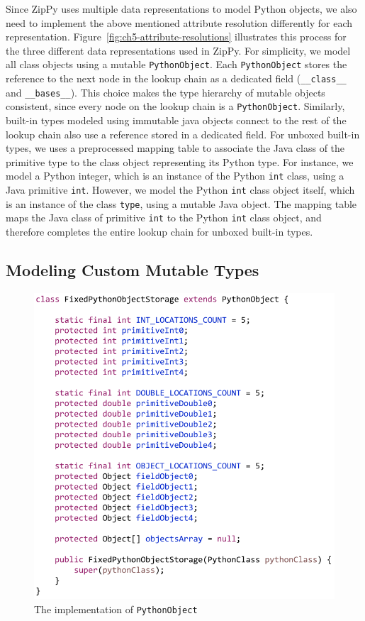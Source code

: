 Since ZipPy uses multiple data representations to model Python objects, we also need to implement the above mentioned attribute resolution differently for each representation.
Figure~\ref{fig:ch5-attribute-resolutions} illustrates this process for the three different data representations used in ZipPy.
For simplicity, we model all class objects using a mutable \texttt{PythonObject}.
Each \texttt{PythonObject} stores the reference to the next node in the lookup chain as a dedicated field (\texttt{\_\_class\_\_} and \texttt{\_\_bases\_\_}).
This choice makes the type hierarchy of mutable objects consistent, since every node on the lookup chain is a \texttt{PythonObject}.
Similarly, built-in types modeled using immutable java objects connect to the rest of the lookup chain also use a reference stored in a dedicated field.
For unboxed built-in types, we uses a preprocessed mapping table to associate the Java class of the primitive type to the class object representing its Python type.
For instance, we model a Python integer, which is an instance of the Python \texttt{int} class, using a Java primitive \texttt{int}.
However, we model the Python \texttt{int} class object itself, which is an instance of the class \texttt{type}, using a mutable Java object.
The mapping table maps the Java class of primitive \texttt{int} to the Python \texttt{int} class object, and therefore completes the entire lookup chain for unboxed built-in types.

\subsection{Modeling Custom Mutable Types}
\label{sec:ch5-custom-mutable-types}

\begin{figure}
\centering
\includegraphics[scale=1.]{figures/ch5-fixed-python-object-code}
\caption{The implementation of \texttt{PythonObject}}
\label{ch5-fixed-python-object-code}
\end{figure}

